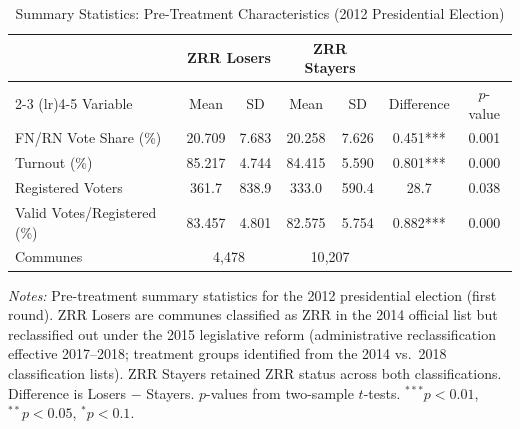 \begin{table}[htbp]
\centering
\caption{Summary Statistics: Pre-Treatment Characteristics (2012 Presidential Election)}
\label{tab:summary_stats}
\begin{tabular}{lcccccc}
\toprule
 & \multicolumn{2}{c}{ZRR Losers} & \multicolumn{2}{c}{ZRR Stayers} & & \\
\cmidrule(lr){2-3} \cmidrule(lr){4-5}
Variable & Mean & SD & Mean & SD & Difference & $p$-value \\
\midrule
FN/RN Vote Share (\%)          & 20.709 & 7.683 & 20.258 & 7.626 & 0.451*** & 0.001 \\
Turnout (\%)                   & 85.217 & 4.744 & 84.415 & 5.590 & 0.801*** & 0.000 \\
Registered Voters              & 361.7 & 838.9 & 333.0 & 590.4 & 28.7 & 0.038 \\
Valid Votes/Registered (\%)    & 83.457 & 4.801 & 82.575 & 5.754 & 0.882*** & 0.000 \\
\midrule
Communes & \multicolumn{2}{c}{4{,}478} & \multicolumn{2}{c}{10{,}207} & & \\
\bottomrule
\end{tabular}
\vspace{0.3em}
\parbox{\textwidth}{\footnotesize
\textit{Notes:} Pre-treatment summary statistics for the 2012 presidential election (first round).
ZRR Losers are communes classified as ZRR in the 2014 official list but reclassified out under the 2015 legislative reform (administrative reclassification effective 2017--2018; treatment groups identified from the 2014 vs.\ 2018 classification lists).
ZRR Stayers retained ZRR status across both classifications.
Difference is Losers $-$ Stayers. $p$-values from two-sample $t$-tests.
$^{***}p<0.01$, $^{**}p<0.05$, $^{*}p<0.1$.}
\end{table}
